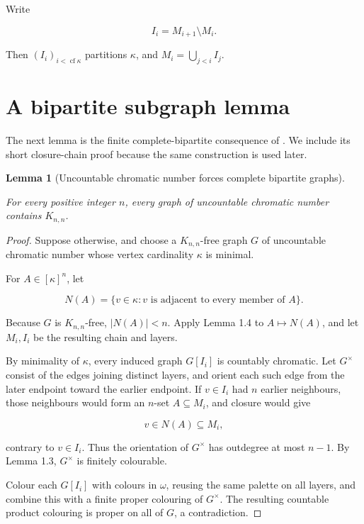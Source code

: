\documentclass[a4paper,11pt,reqno]{amsart}
\theoremstyle{plain}
\newtheorem{lemma}[theorem]{Lemma}
\theoremstyle{definition}
\theoremstyle{remark}
\begin{document}
Write

\[
I_i=M_{i+1}\setminus M_i.
\]

Then \((I_i)_{i<\operatorname{cf}\kappa}\) partitions \(\kappa\), and \(M_i=\bigcup_{j<i}I_j\).

\section{A bipartite subgraph lemma}\label{the-graph-lemma-needed-for-the-expansion-atom}

The next lemma is the finite complete-bipartite consequence of
\citet[Corollary~5.6, p.~72]{erdoshajnal1966}. We include its short
closure-chain proof because the same construction is used later.

\begin{lemma}[Uncountable chromatic number forces complete bipartite graphs]\label{lemma-2.1-uncountable-chromatic-number-forces-complete-bipartite-graphs}

For every positive integer \(n\), every graph of uncountable chromatic number contains \(K_{n,n}\).

\end{lemma}
\begin{proof}
Suppose otherwise, and choose a \(K_{n,n}\)-free graph \(G\) of uncountable chromatic number whose vertex cardinality \(\kappa\) is minimal.

For \(A\in[\kappa]^n\), let

\[
N(A)=\{v\in\kappa:v\text{ is adjacent to every member of }A\}.
\]

Because \(G\) is \(K_{n,n}\)-free, \(|N(A)|<n\). Apply Lemma 1.4 to \(A\mapsto N(A)\), and let \(M_i,I_i\) be the resulting chain and layers.

By minimality of \(\kappa\), every induced graph \(G[I_i]\) is countably chromatic. Let \(G^\times\) consist of the edges joining distinct layers, and orient each such edge from the later endpoint toward the earlier endpoint. If \(v\in I_i\) had \(n\) earlier neighbours, those neighbours would form an \(n\)-set \(A\subseteq M_i\), and closure would give

\[
v\in N(A)\subseteq M_i,
\]

contrary to \(v\in I_i\). Thus the orientation of \(G^\times\) has outdegree at most \(n-1\). By Lemma 1.3, \(G^\times\) is finitely colourable.

Colour each \(G[I_i]\) with colours in \(\omega\), reusing the same palette on all layers, and combine this with a finite proper colouring of \(G^\times\). The resulting countable product colouring is proper on all of \(G\), a contradiction.
\end{proof}
\end{document}
